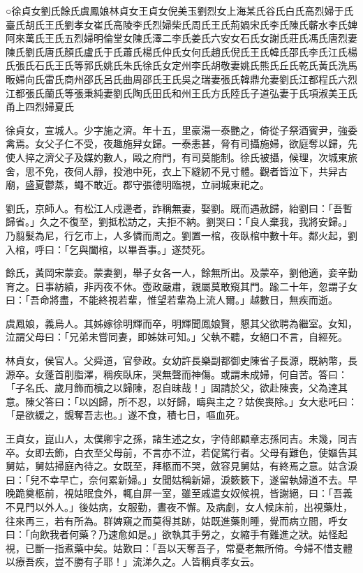 
\begin{pinyinscope}
○徐貞女劉氏餘氏虞鳳娘林貞女王貞女倪美玉劉烈女上海某氏谷氏白氏高烈婦于氏臺氏胡氏王氏劉孝女崔氏高陵李氏烈婦柴氏周氏王氏荊媧宋氏李氏陳氏蘄水李氏婢阿來萬氏王氏五烈婦明倫堂女陳氏澤二李氏姜氏六安女石氏女謝氏莊氏馮氏唐烈妻陳氏劉氏唐氏顏氏盧氏于氏蕭氏楊氏仲氏女何氏趙氏倪氏王氏韓氏邵氏李氏江氏楊氏張氏石氏王氏等郭氏姚氏朱氏徐氏女定州李氏胡敬妻姚氏熊氏丘氏乾氏黃氏洗馬畈婦向氏雷氏商州邵氏呂氏曲周邵氏王氏吳之瑞妻張氏韓鼎允妻劉氏江都程氏六烈江都張氏蘭氏等張秉純妻劉氏陶氏田氏和州王氏方氏陸氏子道弘妻于氏項淑美王氏甬上四烈婦夏氏

徐貞女，宣城人。少字施之濟。年十五，里豪湯一泰艷之，倚從子祭酒賓尹，強委禽焉。女父子仁不受，夜趣施舁女歸。一泰恚甚，脅有司攝施婦，欲庭奪以歸，先使人捽之濟父子及媒妁數人，毆之府門，有司莫能制。徐氏被攝，候理，次城東旅舍，思不免，夜伺人靜，投池中死，衣上下縫紉不見寸體。觀者皆泣下，共舁古廟，盛夏鬱蒸，蠅不敢近。郡守張德明臨視，立祠城東祀之。

劉氏，京師人。有松江人戍邊者，詐稱無妻，娶劉。既而遇赦歸，紿劉曰：「吾暫歸省。」久之不復至，劉抵松訪之，夫拒不納。劉哭曰：「良人棄我，我將安歸。」乃翦髮為尼，行乞市上，人多憐而周之。劉置一棺，夜臥棺中數十年。鄰火起，劉入棺，呼曰：「乞與闔棺，以畢吾事。」遂焚死。

餘氏，黃岡宋蒙妾。蒙妻劉，舉子女各一人，餘無所出。及蒙卒，劉他適，妾辛勤育之。日事紡績，非丙夜不休。壺政嚴肅，親屬莫敢窺其門。踰二十年，忽謂子女曰：「吾命將盡，不能終視若輩，惟望若輩為上流人爾。」越數日，無疾而逝。

虞鳳娘，義烏人。其姊嫁徐明輝而卒，明輝聞鳳娘賢，懇其父欲聘為繼室。女知，泣謂父母曰：「兄弟未嘗同妻，即姊妹可知。」父執不聽，女絕口不言，自經死。

林貞女，侯官人。父舜道，官參政。女幼許長樂副都御史陳省子長源，既納幣，長源卒。女蓬首削脂澤，稱疾臥床，哭無聲而神傷。或謂未成婦，何自苦。答曰：「子名氏、歲月飾而櫝之以歸陳，忍自昧哉！」固請於父，欲赴陳喪，父為達其意。陳父答曰：「以凶歸，所不忍，以好歸，疇與主之？姑俟喪除。」女大悲吒曰：「是欲緩之，覬奪吾志也。」遂不食，積七日，嘔血死。

王貞女，崑山人，太僕卿宇之孫，諸生述之女，字侍郎顧章志孫同吉。未幾，同吉卒。女即去飾，白衣至父母前，不言亦不泣，若促駕行者。父母有難色，使嫗告其舅姑，舅姑掃庭內待之。女既至，拜柩而不哭，斂容見舅姑，有終焉之意。姑含淚曰：「兒不幸早亡，奈何累新婦。」女聞姑稱新婦，淚簌簌下，遂留執婦道不去。早晚跪奠柩前，視姑眠食外，輒自屏一室，雖至戚遣女奴候視，皆謝絕，曰：「吾義不見門以外人。」後姑病，女服勤，晝夜不懈。及病劇，女人候床前，出視藥灶，往來再三，若有所為。群婢窺之而莫得其跡，姑既進藥則睡，覺而病立間，呼女曰：「向飲我者何藥？乃速愈如是。」欲執其手勞之，女縮手有難進之狀。姑怪起視，已斷一指煮藥中矣。姑歎曰：「吾以天奪吾子，常憂老無所倚。今婦不惜支體以療吾疾，豈不勝有子耶！」流涕久之。人皆稱貞孝女云。


\end{pinyinscope}
